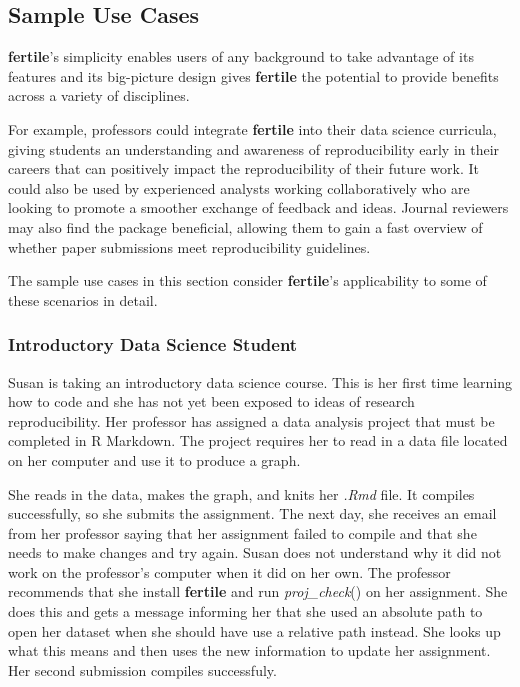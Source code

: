 \documentclass[APA,LATO1COL]{WileyNJD-v2}\usepackage[]{graphicx}\usepackage[]{color}
\newcommand{\R}{\textsf{R}\xspace}
\newcommand{\cmd}[1]{\textit{#1}}
\newcommand{\pkg}[1]{\textbf{#1}}
\newcommand{\func}[1]{\textit{#1}()}
\begin{document}
\subsection{Sample Use Cases}

\pkg{fertile}'s simplicity enables users of any background to take advantage of its features and its big-picture design gives \pkg{fertile} the potential to provide benefits across a variety of disciplines. 

For example, professors could integrate \pkg{fertile} into their data science curricula, giving students an understanding and awareness of reproducibility early in their careers that can positively impact the reproducibility of their future work. It could also be used by experienced analysts working collaboratively who are looking to promote a smoother exchange of feedback and ideas. Journal reviewers may also find the package beneficial, allowing them to gain a fast overview of whether paper submissions meet reproducibility guidelines.

The sample use cases in this section consider \pkg{fertile}'s applicability to some of these scenarios in detail.

\subsubsection{Introductory Data Science Student}

Susan is taking an introductory data science course. This is her first time learning how to code and she has not yet been exposed to ideas of research reproducibility. Her professor has assigned a data analysis project that must be completed in \R Markdown. The project requires her to read in a data file located on her computer and use it to produce a graph.

She reads in the data, makes the graph, and knits her \cmd{.Rmd} file. It compiles successfully, so she submits the assignment. The next day, she receives an email from her professor saying that her assignment failed to compile and that she needs to make changes and try again. Susan does not understand why it did not work on the professor's computer when it did on her own. The professor recommends that she install \pkg{fertile} and run \func{proj\_check} on her assignment. She does this and gets a message informing her that she used an absolute path to open her dataset when she should have use a relative path instead. She looks up what this means and then uses the new information to update her assignment. Her second submission compiles successfuly.
\end{document}
